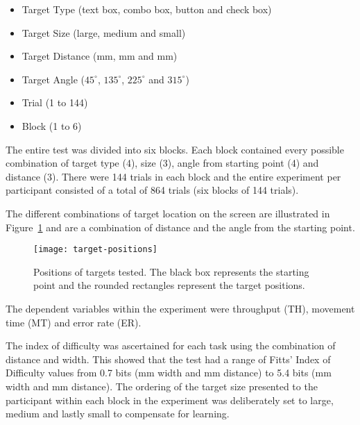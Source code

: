 \documentclass{elsart}
\begin{document}
\begin{itemize}

	\item Target Type (text box, combo box, button and check box)

	\item Target Size (large, medium and small)

	\item Target Distance (\unit[40]{mm}, \unit[80]{mm} and
	\unit[160]{mm})

	\item Target Angle (\(45^{\circ}\), \(135^{\circ}\), \(225^{\circ}\)
	and \(315^{\circ}\))

	\item Trial (1 to 144)

	\item Block (1 to 6)

\end{itemize}

The entire test was divided into six blocks. Each block contained every
possible combination of target type (4), size (3), angle from starting
point (4) and distance (3). There were 144 trials in each block and the
entire experiment per participant consisted of a total of 864 trials
(six blocks of 144 trials).

The different combinations of target location on the screen are
illustrated in Figure~\ref{fig-target-positions} and are a combination
of distance and the angle from the starting point.

\begin{figure}
	\centering
	\texttt{[image: target-positions]}
	\caption{Positions of targets tested. The black box represents the
	starting point and the rounded rectangles represent the target
	positions.}
	\label{fig-target-positions}
\end{figure}


The dependent variables within the experiment were throughput (TH),
movement time (MT) and error rate (ER).

The index of difficulty was ascertained for each task using the
combination of distance and width. This showed that the test had a range
of Fitts' Index of Difficulty values from 0.7 bits (\unit[63]{mm} width
and \unit[160]{mm} distance) to 5.4 bits (\unit[4]{mm} width and
\unit[40]{mm} distance). The ordering of the target size presented to
the participant within each block in the experiment was deliberately set
to large, medium and lastly small to compensate for learning.
\end{document}
